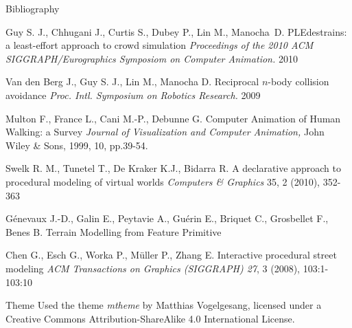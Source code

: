 \documentclass{beamer}
\begin{document}
\begin{frame}[allowframebreaks]{Bibliography}
  \begin{thebibliography}{10}


    Guy S. J., Chhugani J., Curtis S., Dubey P., Lin M., Manocha~D.
    \newblock PLEdestrains: a least-effort approach to crowd simulation
    \newblock \emph{Proceedings of the 2010 ACM SIGGRAPH/Eurographics Symposiom on Computer Animation.} 2010

    Van den Berg J., Guy S. J., Lin M., Manocha D.
    \newblock Reciprocal $n$-body collision avoidance
    \newblock \emph{Proc. Intl. Symposium on Robotics Research.} 2009

    Multon F., France L., Cani M.-P., Debunne G.
    \newblock Computer Animation of Human Walking: a Survey
    \newblock \emph{Journal of Visualization and Computer Animation,} John Wiley \& Sons, 1999, 10, pp.39-54.


    Swelk R. M., Tunetel T., De Kraker K.J., Bidarra R.
    \newblock A declarative approach to procedural modeling of virtual worlds
    \newblock \emph{Computers \& Graphics} 35, 2 (2010), 352-363

    Génevaux J.-D., Galin E., Peytavie A., Guérin E., Briquet C., Grosbellet F., Benes B.
    \newblock Terrain Modelling from Feature Primitive

    Chen G., Esch G., Worka P., Müller P., Zhang E.
    \newblock Interactive procedural street modeling
    \newblock \emph{ACM Transactions on Graphics (SIGGRAPH) 27}, 3 (2008), 103:1-103:10




  \end{thebibliography} 
\end{frame}

\begin{frame}{Theme}
  Used the theme \emph{mtheme} by Matthias Vogelgesang, licensed under a Creative Commons
  Attribution-ShareAlike 4.0 International License.
\end{frame}
\end{document}

